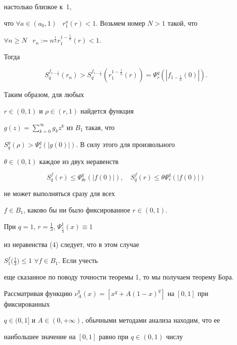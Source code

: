настолько близкое к~1,


что $\forall a \in(a_0,1)$ \ $r_1^a(r)<1$. Возьмем номер $N>1$ такой, что


$\forall n\geq N$ \ $r_n:=n^{\frac{1}{n}}r_1^{1-\frac{1}{n}}(r)<1$.


Тогда


$$


S^{f_{1-\frac1n}}_q(r_n)>S^{f_{1-\frac1n}}_q(r_1^{1-\frac{1}{n}}(r))=


\Psi^q_r(|f_{1-\frac{1}{n}}(0)|).


$$


Таким образом, для любых


$r\in(0,1)$ и $\rho\in(r,1)$ найдется функция


$g(z)=\sum\limits^{\infty}_{k=0}g_kz^k$ из $B_1$ такая, что


$S^g_q(\rho)>\Psi^q_r(|g(0)|)$. В силу этого для произвольного


$\theta\in (0,1)$ каждое из двух неравенств


$$


S^f_q(r)\leq \Psi^q_{\theta r}(|f(0)|),\quad


S^f_q(r)\leq\theta\Psi^q_r(|f(0)|)


$$


не может выполняться сразу для всех


$f\in B_1$, каково бы ни было фиксированное $r\in (0,1)$.





\begin{notenonum}


При $q=1$, $r=\frac13$, $\Psi^1_{\frac13}(x)\equiv 1$


из неравенства (4) следует, что в этом случае


$S^f_1\big(\frac13\big)\leq 1$\; $\forall f\in B_1$. Если учесть


еще сказанное по поводу точности теоремы 1, то мы получаем теорему Бора.


\end{notenonum}





Рассматривая функцию $\nu^q_A(x)=[x^q+A(1-x)^q]$ на $[0,1]$ при фиксированных


$q\in(0,1]$ и $A\in(0,+\infty)$, обычными методами анализа находим, что ее


наибольшее значение на $[0,1]$ равно при $q\in(0,1)$ числу


